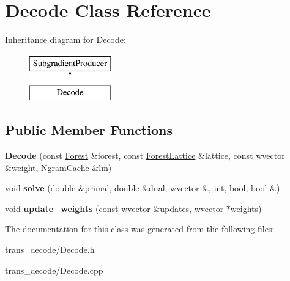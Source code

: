 \hypertarget{class_decode}{
\section{Decode Class Reference}
\label{class_decode}
}
Inheritance diagram for Decode:\begin{figure}[H]
\begin{center}
\leavevmode
\includegraphics[height=2cm]{class_decode}
\end{center}
\end{figure}
\subsection*{Public Member Functions}
\begin{DoxyCompactItemize}
\item 
\hypertarget{class_decode_a57bd53ddaf49e2fe4b86a7aad782110f}{
{\bfseries Decode} (const \hyperlink{class_forest}{Forest} \&forest, const \hyperlink{class_forest_lattice}{ForestLattice} \&lattice, const wvector \&weight, \hyperlink{class_ngram_cache}{NgramCache} \&lm)}
\label{class_decode_a57bd53ddaf49e2fe4b86a7aad782110f}

\item 
\hypertarget{class_decode_a6d86f91ee2c591c54ce2bb97c1dd6888}{
void {\bfseries solve} (double \&primal, double \&dual, wvector \&, int, bool, bool \&)}
\label{class_decode_a6d86f91ee2c591c54ce2bb97c1dd6888}

\item 
\hypertarget{class_decode_a9beca60221318f111b7f4d5acca8e329}{
void {\bfseries update\_\-weights} (const wvector \&updates, wvector $\ast$weights)}
\label{class_decode_a9beca60221318f111b7f4d5acca8e329}

\end{DoxyCompactItemize}


The documentation for this class was generated from the following files:\begin{DoxyCompactItemize}
\item 
trans\_\-decode/Decode.h\item 
trans\_\-decode/Decode.cpp\end{DoxyCompactItemize}
